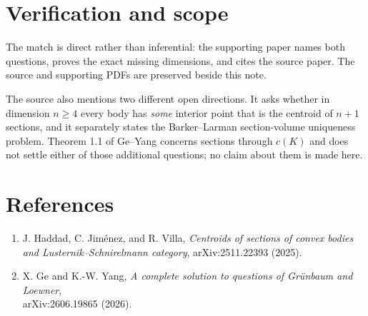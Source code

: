 \documentclass[11pt]{article}
\begin{document}
\section*{Verification and scope}

The match is direct rather than inferential: the supporting paper names both
questions, proves the exact missing dimensions, and cites the source paper.
The source and supporting PDFs are preserved beside this note.

The source also mentions two different open directions.  It asks whether in
dimension $n\geq4$ every body has \emph{some} interior point that is the
centroid of $n+1$ sections, and it separately states the Barker--Larman
section-volume uniqueness problem.  Theorem 1.1 of Ge--Yang concerns
sections through $c(K)$ and does not settle either of those additional
questions; no claim about them is made here.

\section*{References}

\begin{enumerate}
\item J. Haddad, C. Jim\'enez, and R. Villa, \emph{Centroids of sections of
convex bodies and Lusternik--Schnirelmann category}, arXiv:2511.22393 (2025).
\item X. Ge and K.-W. Yang, \emph{A complete solution to questions of
Gr\"unbaum and Loewner},\\ arXiv:2606.19865 (2026).
\end{enumerate}
\end{document}
